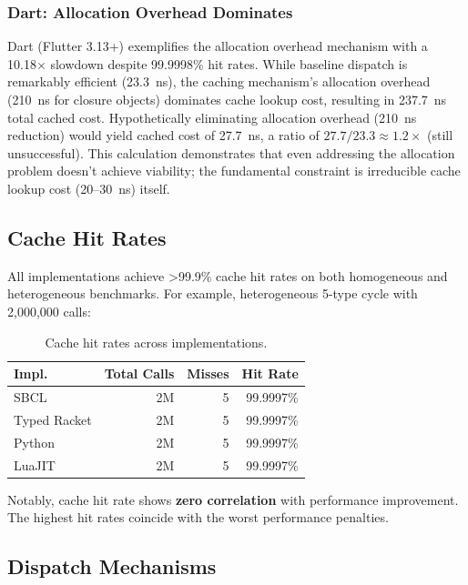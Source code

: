 \documentclass[sigplan,final,acmsmall,review,screen]{acmart}
\begin{document}
\subsubsection{Dart: Allocation Overhead Dominates}

Dart (Flutter 3.13+) exemplifies the allocation overhead mechanism with a 10.18× slowdown despite 99.9998\% hit rates.
While baseline dispatch is remarkably efficient (23.3~ns), the caching mechanism's allocation overhead
(210~ns for closure objects) dominates cache lookup cost, resulting in 237.7~ns total cached cost.
Hypothetically eliminating allocation overhead (210~ns reduction) would yield cached cost of 27.7~ns, a ratio of $27.7 / 23.3 \approx 1.2\times$ (still unsuccessful). This calculation demonstrates that even addressing the allocation problem doesn't achieve viability; the fundamental constraint is irreducible cache lookup cost (20--30~ns) itself.

\subsection{Cache Hit Rates}

All implementations achieve >99.9\% cache hit rates on both homogeneous and heterogeneous
benchmarks. For example, heterogeneous 5-type cycle with 2,000,000 calls:

\begin{table}[h!]
\centering
\small
\caption{Cache hit rates across implementations.}
\label{tab:hit-rates}
\begin{tabular}{@{}lrrr@{}}
\toprule
\textbf{Impl.} & \textbf{Total Calls} & \textbf{Misses} & \textbf{Hit Rate} \\
\midrule
SBCL & 2M & 5 & 99.9997\% \\
Typed Racket & 2M & 5 & 99.9997\% \\
Python & 2M & 5 & 99.9997\% \\
LuaJIT & 2M & 5 & 99.9997\% \\
\bottomrule
\end{tabular}
\end{table}

Notably, cache hit rate shows \textbf{zero correlation} with performance improvement. The
highest hit rates coincide with the worst performance penalties.


\subsection{Dispatch Mechanisms}
\label{sec:dispatch-mechanisms}
\end{document}
